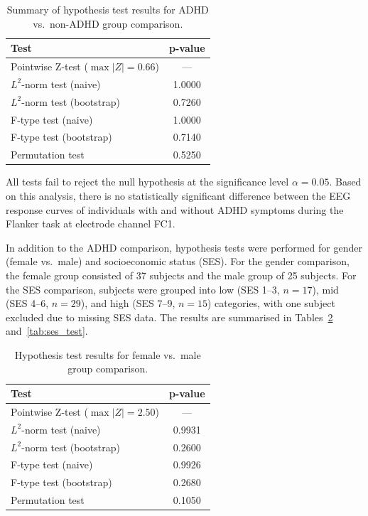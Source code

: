 \documentclass[twoside,11pt]{article}
\begin{document}
\begin{table}[ht]
  \centering
  \begin{tabular}{lc}
    \toprule
    \textbf{Test} & \textbf{p-value} \\
    \midrule
    Pointwise Z-test ($\max |Z| = 0.66$) & --- \\
    $L^2$-norm test (naive)              & 1.0000 \\
    $L^2$-norm test (bootstrap)          & 0.7260 \\
    F-type test (naive)                  & 1.0000 \\
    F-type test (bootstrap)              & 0.7140 \\
    Permutation test                     & 0.5250 \\
    \bottomrule
  \end{tabular}
  \caption{Summary of hypothesis test results for ADHD vs.\ non-ADHD group comparison.}
  \label{tab:hypothesis_tests}
\end{table}

All tests fail to reject the null hypothesis at the significance level $\alpha = 0.05$. Based on
this analysis, there is no statistically significant difference between the EEG response curves of
individuals with and without ADHD symptoms during the Flanker task at electrode channel FC1.

In addition to the ADHD comparison, hypothesis tests were performed for gender (female vs.\ male)
and socioeconomic status (SES). For the gender comparison, the female group consisted of 37 subjects
and the male group of 25 subjects. For the SES comparison, subjects were grouped into low (SES 1--3,
$n=17$), mid (SES 4--6, $n=29$), and high (SES 7--9, $n=15$) categories, with one subject excluded
due to missing SES data. The results are summarised in Tables~\ref{tab:gender_tests}
and~\ref{tab:ses_test}.

\begin{table}[ht]
  \centering
  \begin{tabular}{lc}
    \toprule
    \textbf{Test} & \textbf{p-value} \\
    \midrule
    Pointwise Z-test ($\max |Z| = 2.50$) & --- \\
    $L^2$-norm test (naive)              & 0.9931 \\
    $L^2$-norm test (bootstrap)          & 0.2600 \\
    F-type test (naive)                  & 0.9926 \\
    F-type test (bootstrap)              & 0.2680 \\
    Permutation test                     & 0.1050 \\
    \bottomrule
  \end{tabular}
  \caption{Hypothesis test results for female vs.\ male group comparison.}
  \label{tab:gender_tests}
\end{table}
\end{document}
